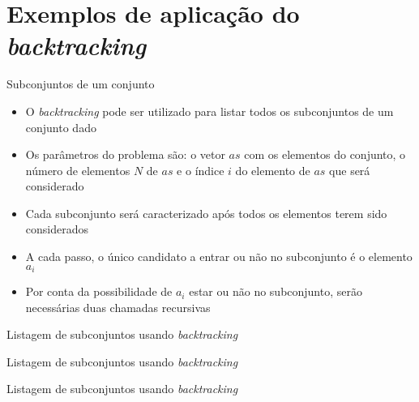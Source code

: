 \section{Exemplos de aplicação do {\it backtracking}}

\begin{frame}[fragile]{Subconjuntos de um conjunto}

    \begin{itemize}
        \item O \textit{backtracking} pode ser utilizado para listar todos os subconjuntos de
            um conjunto dado

        \item Os parâmetros do problema são: o vetor $as$ com os elementos do conjunto, o número
            de elementos $N$ de $as$ e o índice $i$ do elemento de $as$ que será considerado

        \item Cada subconjunto será caracterizado após todos os elementos terem sido considerados

        \item A cada passo, o único candidato a entrar ou não no subconjunto é o elemento $a_i$

        \item Por conta da possibilidade de $a_i$ estar ou não no subconjunto, serão necessárias
            duas chamadas recursivas
    \end{itemize}

\end{frame}

\begin{frame}[fragile]{Listagem de subconjuntos usando {\it backtracking}}
\end{frame}

\begin{frame}[fragile]{Listagem de subconjuntos usando {\it backtracking}}
\end{frame}

\begin{frame}[fragile]{Listagem de subconjuntos usando {\it backtracking}}
\end{frame}

